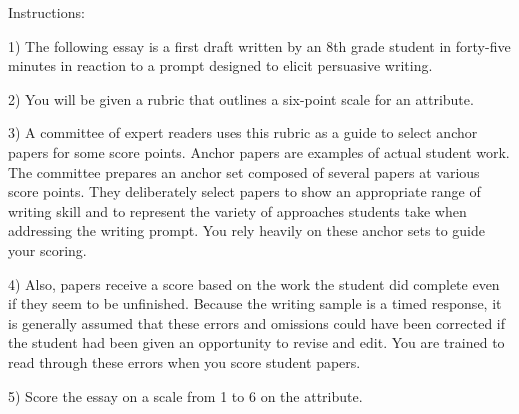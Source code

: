 \begin{tcolorbox}[title=Example of context given to an analytic prompt for edited (Prompt 1),breakable]
Instructions:

1) The following essay is a first draft written by an 8th grade student in forty-five minutes in reaction to a prompt designed to elicit persuasive writing.

2) You will be given a rubric that outlines a six-point scale for an attribute. 

3) A committee of expert readers uses this rubric as a guide to select anchor papers for some score points. Anchor papers are examples of actual student work. The committee prepares an anchor set composed of several papers at various score points. They deliberately select papers to show an appropriate range of writing skill and to represent the variety of approaches students take when addressing the writing prompt. You rely heavily on these anchor sets to guide your scoring.

4) Also, papers receive a score based on the work the student did complete even if they seem to be unfinished. Because the writing sample is a timed response, it is generally assumed that these errors and omissions could have been corrected if the student had been given an opportunity to revise and edit. You are trained to read through these errors when you score student papers.

5) Score the essay on a scale from 1 to 6 on the attribute.
\end{tcolorbox}
